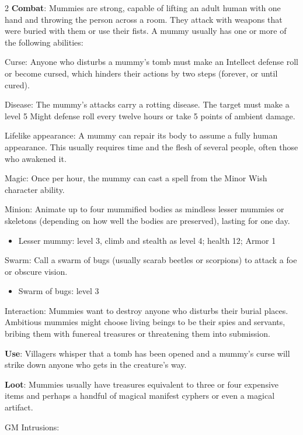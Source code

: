 \begin{multicols}{2}
\textbf{Combat}: Mummies are strong, capable of lifting an adult human with one hand and throwing the person across a room. They attack with weapons that were buried with them or use their fists. A mummy usually has one or more of the following abilities: 

Curse: Anyone who disturbs a mummy’s tomb must make an Intellect defense roll or become cursed, which hinders their
actions by two steps (forever, or until cured). 

Disease: The mummy’s attacks carry a rotting disease. The target must make a level 5 Might defense roll every twelve hours or take 5 points of ambient damage.

Lifelike appearance: A mummy can repair its body to assume a fully human appearance. This usually requires time and the flesh of several people, often those who awakened it.

Magic: Once per hour, the mummy can cast a spell from the Minor Wish character ability.

Minion: Animate up to four mummified bodies as mindless lesser mummies or skeletons (depending on how well the bodies are preserved), lasting for one day. 

\begin{itemize} 
\item Lesser mummy: level 3, climb and stealth as level 4; health 12; Armor 1
\end{itemize} 

Swarm: Call a swarm of bugs (usually scarab beetles or scorpions) to attack a foe or obscure vision.

\begin{itemize} 
\item	Swarm of bugs: level 3
\end{itemize} 

Interaction: Mummies want to destroy anyone who disturbs their burial places. Ambitious mummies might choose living beings to be their spies and servants, bribing them with funereal treasures or threatening them into submission.

\textbf{Use}: Villagers whisper that a tomb has been opened and a mummy’s curse will strike down anyone who gets in the creature’s way.

\textbf{Loot}: Mummies usually have treasures equivalent to three or four expensive items and perhaps a handful of magical manifest cyphers or even a magical artifact.

GM Intrusions:
\begin{itemize} 


\end{itemize}
\end{multicols}

